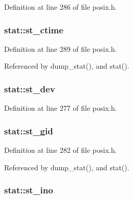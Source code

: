 Definition at line 286 of file posix.\-h.

\hypertarget{structstat_a1b4b858db1ebe79c3d6e0fc1ef721024}{
\subsubsection[{st\-\_\-ctime}]{ stat\-::st\-\_\-ctime}}\label{structstat_a1b4b858db1ebe79c3d6e0fc1ef721024}


Definition at line 289 of file posix.\-h.



Referenced by dump\-\_\-stat(), and stat().

\hypertarget{structstat_ac5b90090ae323741ae4c9e4f3683a29f}{
\subsubsection[{st\-\_\-dev}]{ stat\-::st\-\_\-dev}}\label{structstat_ac5b90090ae323741ae4c9e4f3683a29f}


Definition at line 277 of file posix.\-h.

\hypertarget{structstat_ab864f16f436cec370f0ced585d897698}{
\subsubsection[{st\-\_\-gid}]{ stat\-::st\-\_\-gid}}\label{structstat_ab864f16f436cec370f0ced585d897698}


Definition at line 282 of file posix.\-h.



Referenced by dump\-\_\-stat(), and stat().

\hypertarget{structstat_a9769ed8f0d4c5a9f329c32bc92479d56}{
\subsubsection[{st\-\_\-ino}]{ stat\-::st\-\_\-ino}}\label{structstat_a9769ed8f0d4c5a9f329c32bc92479d56}


